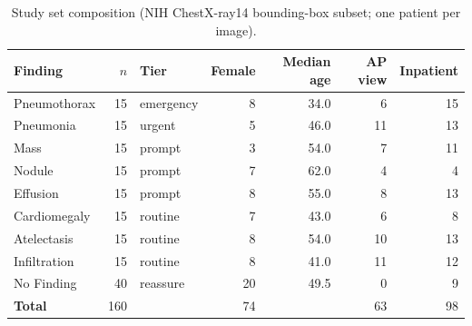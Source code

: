 \begin{table}[t]
\centering
\small
\begin{tabular}{lrlrrrr}
\toprule
Finding & $n$ & Tier & Female & Median age & AP view & Inpatient \\
\midrule
Pneumothorax & 15 & emergency & 8 & 34.0 & 6 & 15 \\
Pneumonia & 15 & urgent & 5 & 46.0 & 11 & 13 \\
Mass & 15 & prompt & 3 & 54.0 & 7 & 11 \\
Nodule & 15 & prompt & 7 & 62.0 & 4 & 4 \\
Effusion & 15 & prompt & 8 & 55.0 & 8 & 13 \\
Cardiomegaly & 15 & routine & 7 & 43.0 & 6 & 8 \\
Atelectasis & 15 & routine & 8 & 54.0 & 10 & 13 \\
Infiltration & 15 & routine & 8 & 41.0 & 11 & 12 \\
No Finding & 40 & reassure & 20 & 49.5 & 0 & 9 \\
\midrule
\textbf{Total} & 160 &  & 74 &  & 63 & 98 \\
\bottomrule
\end{tabular}
\caption{Study set composition (NIH ChestX-ray14 bounding-box subset; one patient per image).}
\label{tab:dataset}
\end{table}
